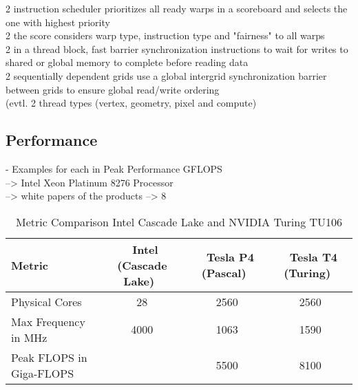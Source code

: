 \documentclass[a4paper,12pt]{llncs}
\numberwithin{equation}{section}
\begin{document}
    2 instruction scheduler prioritizes all ready warps in a scoreboard and selects the one with highest priority\\
    2 the score considers warp type, instruction type and "fairness" to all warps\\

    2 in a thread block, fast barrier synchronization instructions to wait for writes to shared or global memory to complete before reading data\\
    2 sequentially dependent grids use a global intergrid synchronization barrier between grids to ensure global read/write ordering\\
   
(evtl. 2 thread types (vertex, geometry, pixel and compute)

         
\subsection{Performance}
  - Examples for each in Peak Performance GFLOPS\\
    --> Intel Xeon Platinum 8276 Processor \\
    --> white papers of the products --> 8
\begin{table}[htbp]
  \centering
  \caption{Metric Comparison Intel Cascade Lake and NVIDIA Turing TU106}
  \label{tab:comp}
  \begin{tabular}{|l|c|c|c|}
    \hline
	\textbf{Metric} & \textbf{~Intel (Cascade Lake)~} & \textbf{~Tesla P4 (Pascal)~} & \textbf{~Tesla T4 (Turing)~} \\\hline
	Physical Cores & 28 & 2560 & 2560 \\\hline
	Max Frequency in MHz & 4000 & 1063 & 1590 \\\hline
	Peak FLOPS in Giga-FLOPS & & 5500 & 8100 \\\hline
  \end{tabular}
\end{table}

\end{document}
